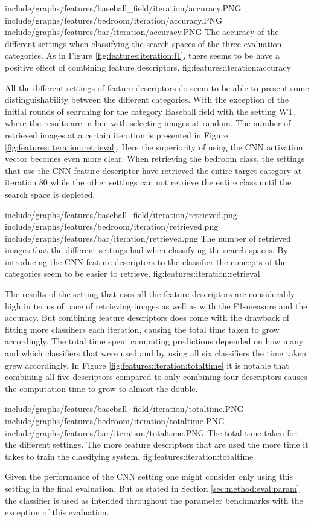 \tripfigurenear
{include/graphs/features/baseball_field/iteration/accuracy.PNG}
{include/graphs/features/bedroom/iteration/accuracy.PNG}
{include/graphs/features/bar/iteration/accuracy.PNG}
{The accuracy of the different settings when classifying the search spaces of the three evaluation categories. As in Figure \ref{fig:features:iteration:f1}, there seems to be have a positive effect of combining feature descriptors.}
{fig:features:iteration:accuracy}


All the different settings of feature descriptors do seem to be able to present some distinguishability between the different categories. With the exception of the initial rounds of searching for the category Baseball field with the setting WT, where the results are in line with selecting images at random. The number of retrieved images at a certain iteration is presented in Figure \ref{fig:features:iteration:retrieval}. Here the superiority of using the CNN activation vector becomes even more clear: When retrieving the bedroom class, the settings that use the CNN feature descriptor have retrieved the entire target category at iteration 80 while the other settings can not retrieve the entire class until the search space is depleted. 

\tripfigurenear
{include/graphs/features/baseball_field/iteration/retrieved.png}
{include/graphs/features/bedroom/iteration/retrieved.png}
{include/graphs/features/bar/iteration/retrieved.png}
{The number of retrieved images that the different settings had when classifying the search spaces. By introducing the CNN feature descriptors to the classifier the concepts of the categories seem to be easier to retrieve.}
{fig:features:iteration:retrieval}


The results of the setting that uses all the feature descriptors are considerably high in terms of pace of retrieving images as well as with the F1-measure and the accuracy. But combining feature descriptors does come with the drawback of fitting more classifiers each iteration, causing the total time taken to grow accordingly.
The total time spent computing predictions depended on how many and which classifiers that were used and by using all six classifiers the time taken grew accordingly. In Figure \ref{fig:features:iteration:totaltime} it is notable that combining all five descriptors compared to only combining four descriptors causes the computation time to grow to almost the double. 

\tripfigure
{include/graphs/features/baseball_field/iteration/totaltime.PNG}
{include/graphs/features/bedroom/iteration/totaltime.PNG}
{include/graphs/features/bar/iteration/totaltime.PNG}
{The total time taken for the different settings. The more feature descriptors that are used the more time it takes to train the classifying system.}
{fig:features:iteration:totaltime}

Given the performance of the CNN setting one might consider only using this setting in the final evaluation. But as stated in Section \ref{sec:method:eval:param} the classifier is used as intended throughout the parameter benchmarks with the exception of this evaluation. 

